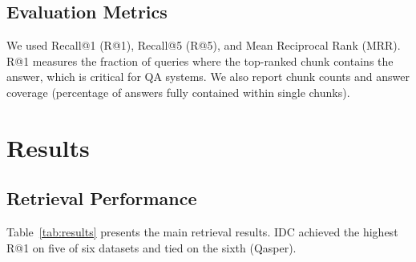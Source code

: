 \documentclass[conference]{IEEEtran}
\begin{document}
\subsection{Evaluation Metrics}

We used Recall@1 (R@1), Recall@5 (R@5), and Mean Reciprocal Rank (MRR). R@1 measures the fraction of queries where the top-ranked chunk contains the answer, which is critical for QA systems. We also report chunk counts and answer coverage (percentage of answers fully contained within single chunks).

\section{Results}

\subsection{Retrieval Performance}

Table~\ref{tab:results} presents the main retrieval results. IDC achieved the highest R@1 on five of six datasets and tied on the sixth (Qasper).
\end{document}
